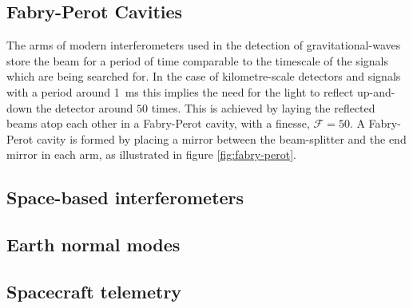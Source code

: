 \documentclass{kentigern}
\begin{document}
\subsection{Fabry-Perot Cavities}
\label{sec:fabry-perot-cavities}
%
%
The arms of modern interferometers used in the detection of
gravitational-waves store the beam for a period of time comparable to
the timescale of the signals which are being searched for. In the case
of kilometre-scale detectors and signals with a period around
\SI{1}{\milli\second} this implies the need for the light to reflect
up-and-down the detector around $50$ times. This is achieved by laying
the reflected beams atop each other in a Fabry-Perot cavity, with a
\gls{finesse}, $\mathcal{F}=50$. A Fabry-Perot cavity is formed by
placing a mirror between the beam-splitter and the end mirror in each
arm, as illustrated in figure \ref{fig:fabry-perot}.

\subsection{Space-based interferometers}
\label{sec:space-based-interf}

\subsection{Earth normal modes}
\label{sec:earth-normal-modes}

\subsection{Spacecraft telemetry}
\label{sec:spacecraft-telemetry}
\end{document}
